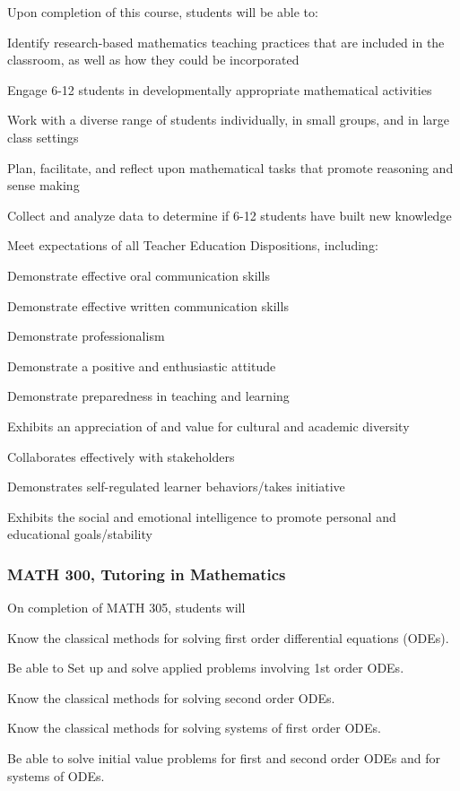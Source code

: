 Upon completion of this course, students will be able to:
\begin{alphalist}
\item Identify research-based mathematics teaching practices that are included in the classroom, as well as how they could be incorporated
\item Engage 6-12 students in developmentally appropriate mathematical activities 
\item Work with a diverse range of students individually, in small groups, and in large class settings
\item Plan, facilitate, and reflect upon mathematical tasks that promote reasoning and sense making
\item Collect and analyze data to determine if 6-12 students have built new knowledge 
\item Meet expectations of all Teacher Education Dispositions, including:
\begin{betalist}
    \item Demonstrate effective oral communication skills
    \item Demonstrate effective written communication skills
    \item Demonstrate professionalism
    \item Demonstrate a positive and enthusiastic attitude
    \item Demonstrate preparedness in teaching and learning
    \item Exhibits an appreciation of and value for cultural and academic diversity
    \item Collaborates effectively with stakeholders
    \item Demonstrates self-regulated learner behaviors/takes initiative
    \item Exhibits the social and emotional intelligence to promote personal and educational goals/stability
\end{betalist}
\end{alphalist}




\subsubsection*{MATH 300, Tutoring in Mathematics}


On completion of MATH 305, students will 
\begin{alphalist}
    \item Know the classical methods for solving first order differential equations (ODEs).
    \item Be able to Set up and solve applied problems involving 1st order ODEs.
    \item Know the classical methods for solving second order ODEs.
    \item Know the classical methods for solving systems of first order ODEs.
    \item Be able to solve initial value problems for first and second order ODEs and for systems of ODEs.
\end{alphalist}

